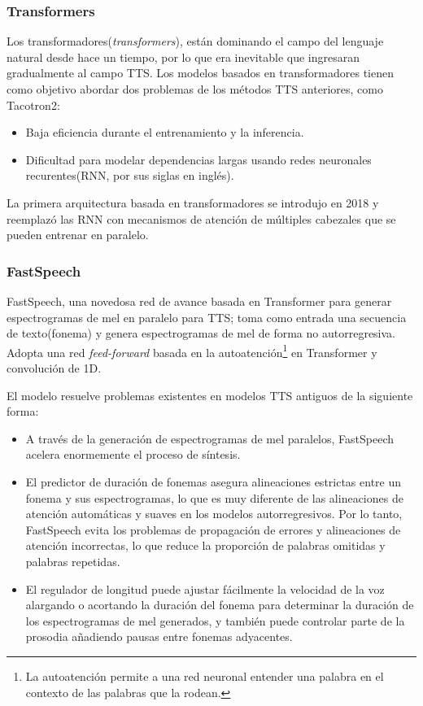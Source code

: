 \subsubsection{Transformers}
Los transformadores(\textit{transformers}), están dominando el campo del lenguaje natural desde hace un tiempo, por lo que era inevitable que ingresaran gradualmente al campo TTS. Los modelos basados en transformadores tienen como objetivo abordar dos problemas de los métodos TTS anteriores, como Tacotron2:

\begin{itemize}
	\item Baja eficiencia durante el entrenamiento y la inferencia.
	\item Dificultad para modelar dependencias largas usando redes neuronales recurentes(RNN, por sus siglas en inglés).
\end{itemize}
La primera arquitectura basada en transformadores se introdujo en 2018 y reemplazó las RNN con mecanismos de atención de múltiples cabezales que se pueden entrenar en paralelo.

\subsubsection{FastSpeech}

FastSpeech, una novedosa red de avance basada en Transformer para generar espectrogramas de mel en paralelo para TTS; toma como entrada una secuencia de texto(fonema) y genera espectrogramas de mel de forma no autorregresiva. Adopta una red \textit{feed-forward} basada en la autoatención\footnote{La autoatención permite a una red neuronal entender una palabra en el contexto de las palabras que la rodean.} en Transformer y convolución de 1D. 


El modelo resuelve problemas existentes en modelos TTS antiguos de la siguiente forma:

\begin{itemize}
	\item A través de la generación de espectrogramas de mel paralelos, FastSpeech acelera enormemente el proceso de síntesis.
	\item El predictor de duración de fonemas asegura alineaciones estrictas entre un fonema y sus espectrogramas, lo que es muy diferente de las alineaciones de atención automáticas y suaves en los modelos autorregresivos. Por lo tanto, FastSpeech evita los problemas de propagación de errores y alineaciones de atención incorrectas, lo que reduce la proporción de palabras omitidas y palabras repetidas.
	\item El regulador de longitud puede ajustar fácilmente la velocidad de la voz alargando o acortando la duración del fonema para determinar la duración de los espectrogramas de mel generados, y también puede controlar parte de la prosodia añadiendo pausas entre fonemas adyacentes.
\end{itemize}



